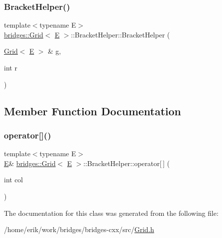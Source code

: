 \subsubsection{\texorpdfstring{Bracket\+Helper()}{BracketHelper()}}
{\footnotesize\ttfamily template$<$typename E$>$ \\
\hyperlink{classbridges_1_1_grid}{bridges\+::\+Grid}$<$ \hyperlink{namespacebridges_acfb0a4f7877d8f63de3e6862004c50eda3a3ea00cfc35332cedf6e5e9a32e94da}{E} $>$\+::Bracket\+Helper\+::\+Bracket\+Helper (\begin{DoxyParamCaption}\item[{\hyperlink{classbridges_1_1_grid}{Grid}$<$ \hyperlink{namespacebridges_acfb0a4f7877d8f63de3e6862004c50eda3a3ea00cfc35332cedf6e5e9a32e94da}{E} $>$ \&}]{g,  }\item[{int}]{r }\end{DoxyParamCaption})\hspace{0.3cm}{\ttfamily [inline]}}



\subsection{Member Function Documentation}
\mbox{\label{classbridges_1_1_grid_1_1_bracket_helper_ad8055b8dd94d6988d8143ab7cf7d3386}} 
\subsubsection{\texorpdfstring{operator[]()}{operator[]()}}
{\footnotesize\ttfamily template$<$typename E$>$ \\
\hyperlink{namespacebridges_acfb0a4f7877d8f63de3e6862004c50eda3a3ea00cfc35332cedf6e5e9a32e94da}{E}\& \hyperlink{classbridges_1_1_grid}{bridges\+::\+Grid}$<$ \hyperlink{namespacebridges_acfb0a4f7877d8f63de3e6862004c50eda3a3ea00cfc35332cedf6e5e9a32e94da}{E} $>$\+::Bracket\+Helper\+::operator\mbox{[}$\,$\mbox{]} (\begin{DoxyParamCaption}\item[{int}]{col }\end{DoxyParamCaption})\hspace{0.3cm}{\ttfamily [inline]}}



The documentation for this class was generated from the following file\+:\begin{DoxyCompactItemize}
\item 
/home/erik/work/bridges/bridges-\/cxx/src/\hyperlink{_grid_8h}{Grid.\+h}\end{DoxyCompactItemize}
